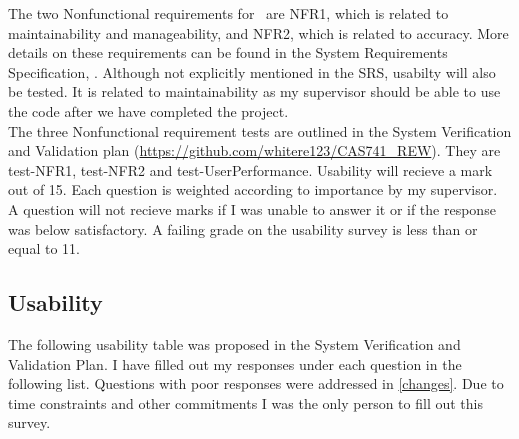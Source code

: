 \documentclass[12pt, titlepage]{article}
\begin{document}
The two Nonfunctional requirements for \progname \ are NFR1, which is related 
to maintainability and manageability, and NFR2, which is related to accuracy. 
More details on these requirements can be found in the System 
Requirements Specification, \cite{SRS}. Although not explicitly mentioned in 
the SRS, usabilty will also be tested. It is related to maintainability as my 
supervisor should be able to use the code after we have completed the project.\\
The three Nonfunctional requirement tests are outlined in the System 
Verification and Validation plan 
(\url{https://github.com/whitere123/CAS741_REW}). They are test-NFR1, test-NFR2 
and test-UserPerformance. Usability will recieve a mark out of 15. Each 
question is weighted according to importance by my supervisor. A question will 
not recieve marks if I was unable to answer 
it or if the response was below satisfactory. A failing grade on the usability 
survey is less than or equal to 11. 

\subsection{Usability} 

The following usability table was proposed in the System Verification and 
Validation Plan. I have filled out my responses under each question in the 
following list. Questions 
with poor responses were addressed in \ref{changes}. Due to time constraints 
and other commitments I was the only person to fill out this survey.
\end{document}
